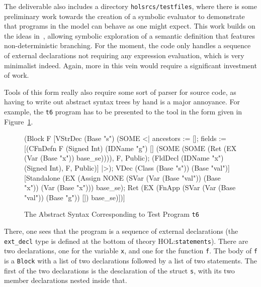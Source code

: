 \documentclass[11pt]{article}
\newcommand{\HOLfile}[1]{HOL:\texttt{#1}}
\begin{document}
The deliverable also includes a directory \texttt{holsrcs/testfiles},
where there is some preliminary work towards the creation of a
symbolic evaluator to demonstrate that programs in the model can
behave as one might expect.  This work builds on the ideas
in~\cite{netsem:popl2006}, allowing symbolic exploration of a semantic
definition that features non-deterministic branching.  For the moment,
the code only handles a sequence of external declarations not
requiring any expression evaluation, which is very minimalist indeed.
Again, more in this vein would require a significant investment of
work.

Tools of this form really also require some sort of parser for \cpp{}
source code, as having to write out abstract syntax trees by hand is a
major annoyance.  For example, the \texttt{t6} program has to be
presented to the tool in the form given in
Figure~\ref{fig:translated-t6}.
\begin{figure}
\begin{stdrule}
    [Decl (VDec (Signed Int) (Base "x"));
     FnDefn (Signed Int) (Base "f") []
       (Block F
          [VStrDec (Base "s")
             (SOME
               <| ancestors := [];
                  fields := [(CFnDefn F (Signed Int) (IDName "g") []
                                (SOME
                                  (SOME (Ret (EX (Var (Base "x"))
                                                 base_se)))),
                                F, Public);
                             (FldDecl (IDName "x") (Signed Int),
                              F, Public)]
               |>);
           VDec (Class (Base "s")) (Base "val")]
          [Standalone
             (EX
              (Assign NONE
                      (SVar (Var (Base "val")) (Base "x"))
                      (Var (Base "x")))
              base_se);
           Ret (EX (FnApp (SVar (Var (Base "val")) (Base "g")) [])
                      base_se)])]
\end{stdrule}
\caption{The Abstract Syntax Corresponding to Test Program
  \texttt{t6}}
\label{fig:translated-t6}
\end{figure}
There, one sees that the program is a sequence of external
declarations (the \texttt{ext_decl} type is defined at the bottom of
theory \HOLfile{statements}).  There are two declarations, one for the
variable \texttt{x}, and one for the function \texttt{f}.  The body of
\texttt{f} is a \texttt{Block} with a list of two declarations
followed by a list of two statements.  The first of the two
declarations is the desclaration of the struct \texttt{s}, with its
two member declarations nested inside that.
\end{document}
